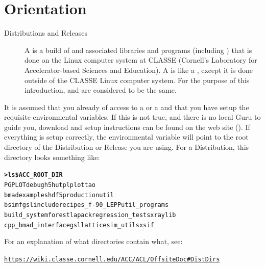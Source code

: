 \documentclass{hitec}
\newcommand{\BF}[1]{{\normalfont\textbf{#1}}}
\newcommand{\Section}[1]{\section{#1}\vspace*{-1ex}}
\newenvironment{display}
  {\vspace*{-1.5ex} \begin{alltt}}
  {\end{alltt} \vspace*{-1.0ex}}
\begin{document}
\Section{Orientation}

  \begin{description}
  \item[Distributions and Releases] \Newline
A  is a build of \bmad and associated libraries and programs (including \tao)
that is done on the Linux computer system at CLASSE (Cornell's Laboratory for
Accelerator-based Sciences and Education). A  is like a ,
except it is done outside of the CLASSE Linux computer system. For the purpose
of this introduction,  and  are considered to be the same.
  \end{description}

It is assumed that you already of access to a  or a  and that
you have setup the requisite environmental variables. If this is not true, and there is no
local \bmad Guru to guide you, download and setup instructions can be found on the \bmad web
site (). If everything is setup correctly, the environmental variable
 will point to the root directory of the Distribution or Release you are
using. For a Distribution, this directory looks something like:
\begin{display}
  \BF{> ls \$ACC_ROOT_DIR}
  PGPLOT                debug       h5hut        plplot                tao
  bmad                  examples    hdf5         production            util
  bsim                  fgsl        include      recipes_f-90_LEPP     util_programs
  build_system          forest      lapack       regression_tests      xraylib
  cpp_bmad_interface    gsl         lattice      sim_utils             xsif
\end{display}

For an explanation of what directories contain what, see:
\begin{display}
  \url{https://wiki.classe.cornell.edu/ACC/ACL/OffsiteDoc#DistDirs}
\end{display}
\end{document}
